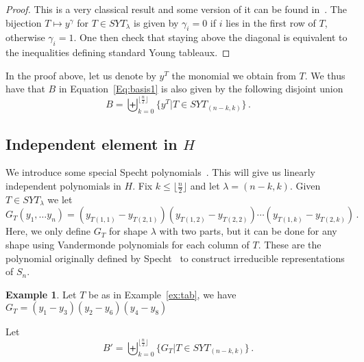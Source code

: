 \documentclass[12pt,reqno]{amsart}
\theoremstyle{plain}
\theoremstyle{definition}
\newtheorem{example}[theorem]{Example}
\begin{document}
\begin{proof}
This is a very classical result and some version of it can be found in~\cite{Stanley}. The bijection $T\mapsto y^\gamma$ for $T\in SYT_\lambda$ is  given by $\gamma_i=0$ if $i$ lies in the first row of $T$, otherwise $\gamma_i=1$. One then check that staying above the diagonal is equivalent to the inequalities defining standard  Young tableaux.
\end{proof}

In the proof above, let us denote by  $y^T$ the monomial we obtain from $T$. We thus have that $B$ in  Equation~\eqref{Eq:basis1} is also given by the following disjoint union
\begin{equation}\label{Eq:BinT}
	B=\biguplus_{k=0}^{ \lfloor \frac{n}{2} \rfloor} \big\{ y^T \big| T \in SYT_{(n-k,k)}\big\}\,.
\end{equation}


\subsection{Independent element in $H$}\label{ss:specht}
We introduce some special Specht polynomials~\cite{Specht}. This will give us linearly independent polynomials in $H$.
Fix $k\le \lfloor \frac{n}{2} \rfloor$ and let $\lambda=(n-k,k)$. Given $T\in SYT_\lambda$ we let
\begin{equation}\label{eq:Gpoly}
 G_T(y_1,\ldots y_n) = (y_{T(1,1)} - y_{T(2,1)})  (y_{T(1,2)} - y_{T(2,2)}) \cdots  (y_{T(1,k)} - y_{T(2,k)}) \,.
 \end{equation}
  Here, we only define $G_T$ for shape $\lambda$ with two parts, but it can be done for any shape using Vandermonde polynomials for each column of $T$. 
  These are  the polynomial originally  defined by Specht~\cite{Specht} to construct irreducible representations of $S_n$.
\begin{example}
  Let $T$ be as in Example~\ref{ex:tab}, we have $G_T=(y_1-y_3)(y_2-y_6)(y_4-y_8)$
\end{example}
Let
\begin{equation}\label{Eq:B2inT}
	B'=\biguplus_{k=0}^{ \lfloor \frac{n}{2} \rfloor} \big\{ G_T \big| T \in SYT_{(n-k,k)}\big\}\,.
\end{equation}
\end{document}
